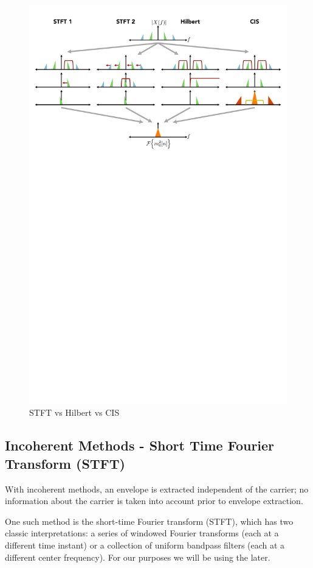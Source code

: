\documentclass [11pt, proquest] {uwthesis}[2015/03/03]
\begin{document}
\begin{figure}[!ht]
  \centering
    \includegraphics[width=1.0\textwidth]{STFTvsHILBERTvsCIS}   
    \caption{STFT vs Hilbert vs CIS}
\end{figure}

\subsection{Incoherent Methods - Short Time Fourier Transform (STFT)}

With incoherent methods, an envelope is extracted independent of the carrier; no information about the carrier is taken into account prior to envelope extraction.

One such method is the short-time Fourier transform (STFT), which has two classic interpretations: a series of windowed Fourier transforms (each at a different time instant) or a collection of uniform bandpass filters (each at a different center frequency).  For our purposes we will be using the later.
\end{document}
